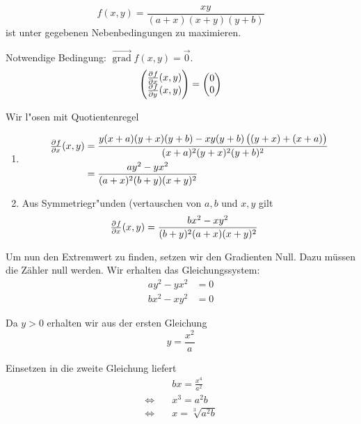 \documentclass[a4paper,german,12pt,smallheadings]{scrartcl}
\begin{document}
  \begin{equation}
    f(x,y) = \frac{xy}{(a+x)(x+y)(y+b)}
  \end{equation}
  ist unter gegebenen Nebenbedingungen zu maximieren. %

  Notwendige Bedingung: $\vec{\operatorname{grad}} f(x,y) = \vec{0}$.
  \begin{equation}
    \begin{pmatrix}
      \pd{f}{x}(x,y) \\
      \pd{f}{y}(x,y)
    \end{pmatrix}
    =
  \begin{pmatrix} 0 \\ 0 \end{pmatrix}
  \end{equation}

  Wir l"osen mit Quotientenregel
  \begin{enumerate}[(1)]
    \item
      \begin{align*}
        \pd{f}{x}(x,y) &= \frac{y(x+a)(y+x)(y+b) - xy(y+b)\del{(y+x)+(x+a)}}{(x+a)^2(y+x)^2(y+b)^2} \\
                       &= \frac{ay^2 -yx^2}{(a+x)^2(b+y)(x+y)^2}
      \end{align*}
      \item
        Aus Symmetriegr"unden (vertauschen von $a,b$ und $x,y$ gilt
        \begin{align*}
        \pd{f}{x}(x,y) &= \frac{bx^2 -xy^2}{(b+y)^2(a+x)(x+y)^2}
        \end{align*}
  \end{enumerate}

  Um nun den Extremwert zu finden, setzen wir den Gradienten Null. Dazu müssen die Zähler null werden. Wir erhalten das Gleichungssystem:
  \begin{align*}
    ay^2 - yx^2 &= 0\\
    bx^2 - xy^2 &= 0
  \end{align*}

  Da $y > 0$ erhalten wir aus der ersten Gleichung
  \begin{equation*}
    y = \frac{x^2}{a}
  \end{equation*}

  Einsetzen in die zweite Gleichung liefert
  \begin{align*}
                         & bx = \frac{x^4}{a^2} \\
    \Leftrightarrow\quad & x^3 = a^2b \\
    \Leftrightarrow\quad & x   = \sqrt[3]{a^2b}
  \end{align*}
\end{document}
